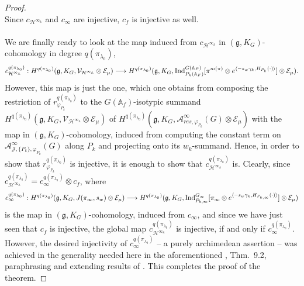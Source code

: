 \documentclass[a4paper,10pt]{amsart}
\theoremstyle{definition}
\numberwithin{equation}{section}
\def\A{\mathbb A}
\def\EE{\mathcal E}
\def\g{\mathfrak g}
\begin{document}
\begin{proof}
$$ $$
Since $c_{\mathcal H^{\infty_\A}}$ and $c_\infty$ are injective, $c_f$ is injective as well.\\\\
We are finally ready to look at the map induced from $c_{\mathcal H^{\infty_\A}}$ in $(\g,K_G)$-cohomology in degree $q(\pi_{\lambda_0})$,
\begin{equation*}
c_{\mathcal H^{\infty_\A}}^{q(\pi_{\lambda_0})}: H^{q(\pi_{\lambda_0})}(\g,K_G, \mathcal V_{\mathcal H^{\infty_\A}}\otimes \EE_\mu) \longrightarrow H^{q(\pi_{\lambda_0})}(\g,K_G, {\rm Ind}_{P_k(\A_F)}^{G(\A_F)}[\pi^{m(\pi)}\otimes e^{\langle -s_w\gamma_k,H_{P_k}(\cdot)\rangle}]\otimes\EE_\mu).
\end{equation*}
However, this map is just the one, which one obtains from composing the restriction of $r^{q(\pi_{\lambda_0})}_{\varphi_{P_k}}$ to the $G(\A_f)$-isotypic summand $H^{q(\pi_{\lambda_0})}(\g,K_G, \mathcal V_{\mathcal H^{\infty_\A}}\otimes \EE_\mu)$ of $H^{q(\pi_{\lambda_0})}(\g,K_G, \mathcal A^\infty_{res,\varphi_{P_k}}(G)\otimes\EE_\mu)$ with the map in $(\g,K_G)$-cohomology, induced from computing the constant term on $\mathcal A^\infty_{\mathcal J,\{P_k\},\varphi_{P_k}}(G)$ along $P_k$ and projecting onto its $w_k$-summand. Hence, in order to show that $r^{q(\pi_{\lambda_0})}_{\varphi_{P_k}}$ is injective, it is enough to show that $c_{\mathcal H^{\infty_\A}}^{q(\pi_{\lambda_0})}$ is. Clearly, since $c_{\mathcal H^{\infty_\A}}^{q(\pi_{\lambda_0})}=c_\infty^{q(\pi_{\lambda_0})}\otimes c_f$, where
$$c_\infty^{q(\pi_{\lambda_0})}: H^{q(\pi_{\lambda_0})}(\g,K_G, J(\pi_\infty,s_w)\otimes \EE_\mu) \longrightarrow H^{q(\pi_{\lambda_0})}(\g,K_G, {\rm Ind}_{P_{k,\infty}}^{G_\infty}[\pi_\infty\otimes e^{\langle -s_w\gamma_k, H_{P_{k,\infty}}(\cdot)\rangle}]\otimes\EE_\mu)$$
is the map in $(\g,K_G)$-cohomology, induced from $c_\infty$, and since we have just seen that $c_f$ is injective, the global map $c_{\mathcal H^{\infty_\A}}^{q(\pi_{\lambda_0})}$ is injective, if and only if $c_\infty^{q(\pi_{\lambda_0})}$. However, the desired injectivity of $c_\infty^{q(\pi_{\lambda_0})}$ -- a purely archimedean assertion -- was achieved in the generality needed here in the aforementioned \cite{CKT}, Thm.\ 9.2, paraphrasing and extending results of \cite{rosp}. This completes the proof of the theorem.


\end{proof}
\end{document}
